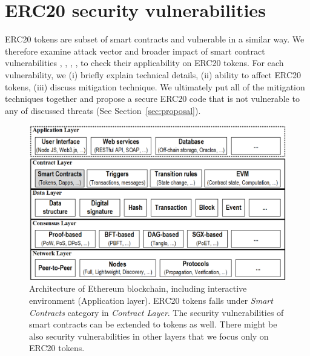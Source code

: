 
\section{ERC20 security vulnerabilities}\label{sec:vul}
ERC20 tokens are subset of smart contracts and vulnerable in a similar way. We therefore examine attack vector and broader impact of smart contract vulnerabilities \cite{SolidtySecBlog}, \cite{EthSecServ}, \cite{SoliditySecCon}, \cite{ConsensysSecCon}, \cite{LandoKL} to check their applicability on ERC20 tokens. For each vulnerability, we (i) briefly explain technical details, (ii) ability to affect ERC20 tokens, (iii) discuss mitigation technique. We ultimately put all of the mitigation techniques together and propose a secure ERC20 code that is not vulnerable to any of discussed threats (See Section~\ref{sec:proposal}).

\begin{figure}[t!]
	\centering
	\includegraphics[width=1.0\linewidth]{figures/blockchain.png}
	\caption{Architecture of Ethereum blockchain, including interactive environment (\ie Application layer). ERC20 tokens falls under \textit{Smart Contracts} category in \textit{Contract Layer}. The security vulnerabilities of smart contracts can be extended to tokens as well. There might be also security vulnerabilities in other layers that we focus only on ERC20 tokens.}\label{fig:blockchain}
\end{figure}

